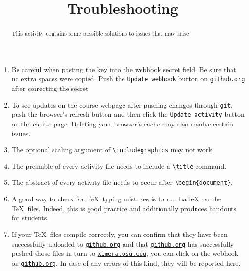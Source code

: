 \documentclass{ximera}
\title{Troubleshooting}
\begin{document}
\begin{abstract}
This activity contains some possible solutions
to issues that may arise
\end{abstract}
\begin{enumerate}
 \item Be careful when pasting the key into
the webhook secret field. Be sure that no extra
spaces were copied. Push the \verb!Update webhook! button on
\href{http://github.org}{\tt github.org}
after correcting the secret.

\item To see updates on the course webpage
after pushing changes through \verb!git!,
push the browser's refresh button
and then click the \verb!Update activity! button 
on the course page. Deleting your browser's cache
may also resolve certain issues.

\item The optional scaling argument of \verb!\includegraphics!
may not work.

\item The preamble of every activity file needs to 
include a \verb!\title! command. 

\item The abstract of every activity file
needs to occur after \verb!\begin{document}!.

\item A good way to check for \TeX\ typing mistakes
is to run \LaTeX\ on the \TeX\ files. Indeed, this
is good practice and additionally produces handouts for students.

\item If your \TeX\ files compile correctly,
you can confirm that they have been successfully uploaded to
\href{http://github.org}{\tt github.org} and that 
\href{http://github.org}{\tt github.org} has successfully
pushed those files in turn to
\href{http://ximera.osu.edu}{\tt ximera.osu.edu},
you can click on the webhook on
\href{http://github.org}{\tt github.org}.
In case of any errors of this kind, they will be reported here.

\end{enumerate}
\end{document}
